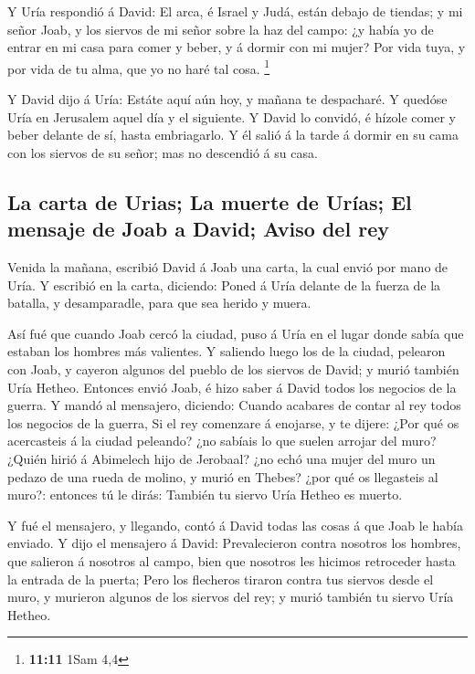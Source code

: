  Y Uría respondió á David: El arca, é Israel y Judá,
están debajo de tiendas; y mi señor Joab, y los siervos de mi señor
sobre la haz del campo: ¿y había yo de entrar en mi casa para comer y
beber, y á dormir con mi mujer? Por vida tuya, y por vida de tu alma,
que yo no haré tal cosa. \footnote{\textbf{11:11} 1Sam 4,4}

 Y David dijo á Uría: Estáte aquí aún hoy, y mañana te
despacharé. Y quedóse Uría en Jerusalem aquel día y el siguiente.
 Y David lo convidó, é hízole comer y beber delante de
sí, hasta embriagarlo. Y él salió á la tarde á dormir en su cama con los
siervos de su señor; mas no descendió á su casa.

\hypertarget{la-carta-de-urias-la-muerte-de-uruxedas-el-mensaje-de-joab-a-david-aviso-del-rey}{%
\subsection{La carta de Urias; La muerte de Urías; El mensaje de Joab a
David; Aviso del
rey}\label{la-carta-de-urias-la-muerte-de-uruxedas-el-mensaje-de-joab-a-david-aviso-del-rey}}

 Venida la mañana, escribió David á Joab una carta, la
cual envió por mano de Uría.  Y escribió en la carta,
diciendo: Poned á Uría delante de la fuerza de la batalla, y
desamparadle, para que sea herido y muera.

 Así fué que cuando Joab cercó la ciudad, puso á Uría en
el lugar donde sabía que estaban los hombres más valientes.
 Y saliendo luego los de la ciudad, pelearon con Joab, y
cayeron algunos del pueblo de los siervos de David; y murió también Uría
Hetheo.  Entonces envió Joab, é hizo saber á David todos
los negocios de la guerra.  Y mandó al mensajero,
diciendo: Cuando acabares de contar al rey todos los negocios de la
guerra,  Si el rey comenzare á enojarse, y te dijere:
¿Por qué os acercasteis á la ciudad peleando? ¿no sabíais lo que suelen
arrojar del muro?  ¿Quién hirió á Abimelech hijo de
Jerobaal? ¿no echó una mujer del muro un pedazo de una rueda de molino,
y murió en Thebes? ¿por qué os llegasteis al muro?: entonces tú le
dirás: También tu siervo Uría Hetheo es muerto.

 Y fué el mensajero, y llegando, contó á David todas las
cosas á que Joab le había enviado.  Y dijo el mensajero á
David: Prevalecieron contra nosotros los hombres, que salieron á
nosotros al campo, bien que nosotros les hicimos retroceder hasta la
entrada de la puerta;  Pero los flecheros tiraron contra
tus siervos desde el muro, y murieron algunos de los siervos del rey; y
murió también tu siervo Uría Hetheo.

